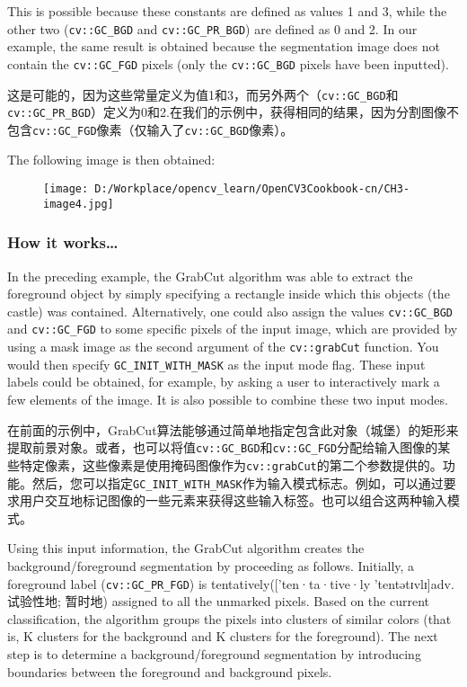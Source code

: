\documentclass[]{article}
\begin{document}
This is possible because these constants are defined as values 1 and 3,
while the other two (\texttt{cv::GC\_BGD} and \texttt{cv::GC\_PR\_BGD})
are defined as 0 and 2. In our example, the same result is obtained
because the segmentation image does not contain the \texttt{cv::GC\_FGD}
pixels (only the \texttt{cv::GC\_BGD} pixels have been inputted).

这是可能的，因为这些常量定义为值1和3，而另外两个（\texttt{cv::GC\_BGD}和\texttt{cv::GC\_PR\_BGD}）定义为0和2.在我们的示例中，获得相同的结果，因为分割图像不包含\texttt{cv::GC\_FGD}像素（仅输入了\texttt{cv::GC\_BGD}像素）。

The following image is then obtained:

\begin{figure}
\centering
\texttt{[image: D:/Workplace/opencv\_learn/OpenCV3Cookbook-cn/CH3-image4.jpg]}
\caption{}
\end{figure}

\hypertarget{header-n1313}{%
\subsubsection{How it works\ldots{}}\label{header-n1313}}

In the preceding example, the GrabCut algorithm was able to extract the
foreground object by simply specifying a rectangle inside which this
objects (the castle) was contained. Alternatively, one could also assign
the values \texttt{cv::GC\_BGD} and \texttt{cv::GC\_FGD} to some
specific pixels of the input image, which are provided by using a mask
image as the second argument of the \texttt{cv::grabCut} function. You
would then specify \texttt{GC\_INIT\_WITH\_MASK} as the input mode flag.
These input labels could be obtained, for example, by asking a user to
interactively mark a few elements of the image. It is also possible to
combine these two input modes.

在前面的示例中，GrabCut算法能够通过简单地指定包含此对象（城堡）的矩形来提取前景对象。或者，也可以将值\texttt{cv::GC\_BGD}和\texttt{cv::GC\_FGD}分配给输入图像的某些特定像素，这些像素是使用掩码图像作为\texttt{cv::grabCut}的第二个参数提供的。功能。然后，您可以指定\texttt{GC\_INIT\_WITH\_MASK}作为输入模式标志。例如，可以通过要求用户交互地标记图像的一些元素来获得这些输入标签。也可以组合这两种输入模式。

Using this input information, the GrabCut algorithm creates the
background/foreground segmentation by proceeding as follows. Initially,
a foreground label (\texttt{cv::GC\_PR\_FGD}) is
tentatively({[}'ten·ta·tive·ly \textbar{}\textbar{} 'tentətɪvlɪ{]}adv.
试验性地; 暂时地) assigned to all the unmarked pixels. Based on the
current classification, the algorithm groups the pixels into clusters of
similar colors (that is, K clusters for the background and K clusters
for the foreground). The next step is to determine a
background/foreground segmentation by introducing boundaries between the
foreground and background pixels.
\end{document}
